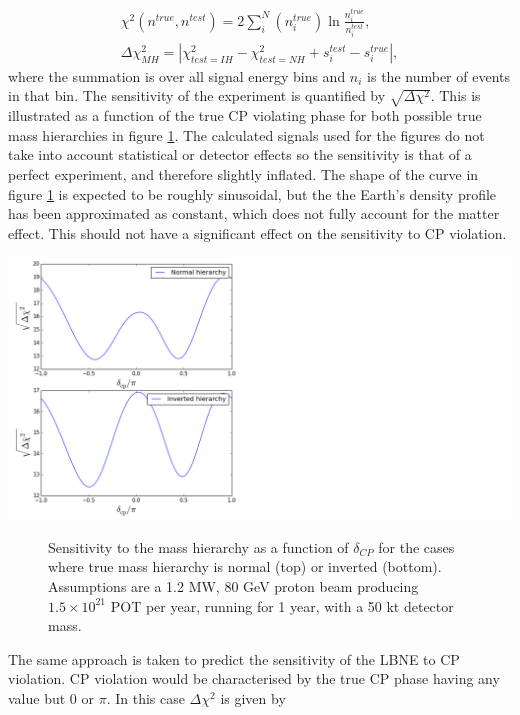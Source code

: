 \documentclass[12pt]{article}
\begin{document}
\begin{align}
\chi^2(n^{true},n^{test})=2\sum\limits_{i}^{N}(n_{i}^{true})\ln{\frac{n_{i}^{true}}{n_{i}^{test}}},\\
\Delta \chi^2_{MH}=|\chi^2_{test=IH}-\chi^2_{test=NH}+s_{i}^{test}-s_{i}^{true}|,
\end{align}
where the summation is over all signal energy bins and $n_i$ is the number of events in that bin. The sensitivity of the experiment is quantified by $\sqrt{\Delta \chi^2}$. This is illustrated as a function of the true CP violating phase for both possible true mass hierarchies in figure \ref{fig:sensitivity1}. The calculated signals used for the figures do not take into account statistical or detector effects so the sensitivity is that of a perfect experiment, and therefore slightly inflated. The shape of the curve in figure \ref{fig:sensitivity1} is expected to be roughly sinusoidal\cite{LBNE}, but the the Earth's density profile has been approximated as constant, which does not fully account for the matter effect. This should not have a significant effect on the sensitivity to CP violation.
\begin{center}
\includegraphics[scale=0.9]{MH_sensitivity.png}
\begin{figure}[h!]
\caption{Sensitivity to the mass hierarchy as a function of $\delta_{CP}$ for the cases where true mass hierarchy is normal (top) or inverted (bottom). Assumptions are a 1.2 MW, 80 GeV proton beam producing $1.5\times 10^{21}$ POT per year, running for 1 year, with a 50 kt detector mass.}
\label{fig:sensitivity1}
\end{figure}
\end{center}
The same approach is taken to predict the sensitivity of the LBNE to CP violation. CP violation would be characterised by the true CP phase having any value but $0$ or $\pi$. In this case $\Delta \chi^2$ is given by \cite{CHI}
\end{document}
